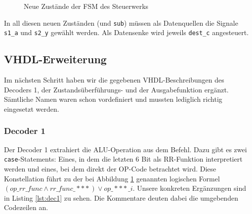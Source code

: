 \documentclass[12pt,a4paper]{scrartcl}
\begin{document}
\begin{figure}
    \label{fig:fsm}
    \caption{Neue Zust\"ande der FSM des Steuerwerks}
\end{figure}

In all diesen neuen Zust\"anden (und \texttt{sub}) m\"ussen als Datenquellen die Signale \texttt{s1\_a} und \texttt{s2\_y} gew\"ahlt werden.
Als Datensenke wird jeweils \texttt{dest\_c} angesteuert.

\subsection*{VHDL-Erweiterung}
Im n\"achsten Schritt haben wir die gegebenen VHDL-Beschreibungen des Decoders 1, der Zustands\"uberf\"uhrungs- und der Ausgabefunktion erg\"anzt.
S\"amtliche Namen waren schon vordefiniert und mussten lediglich richtig eingesetzt werden.

\subsubsection*{Decoder 1}
Der Decoder 1 extrahiert die ALU-Operation aus dem Befehl.
Dazu gibt es zwei \texttt{case}-Statements:
Eines, in dem die letzten 6 Bit als RR-Funktion interpretiert werden und eines, bei dem direkt der OP-Code betrachtet wird.
Diese Konstellation f\"uhrt zu der bei Abbildung \ref{fig:fsm} genannten logischen Formel $(op\_rr\_func \wedge rr\_func\_***) \vee op\_***\_i$.
Unsere konkreten Erg\"anzungen sind in Listing \ref{lst:dec1} zu sehen.
Die Kommentare deuten dabei die umgebenden Codezeilen an.

\end{document}
